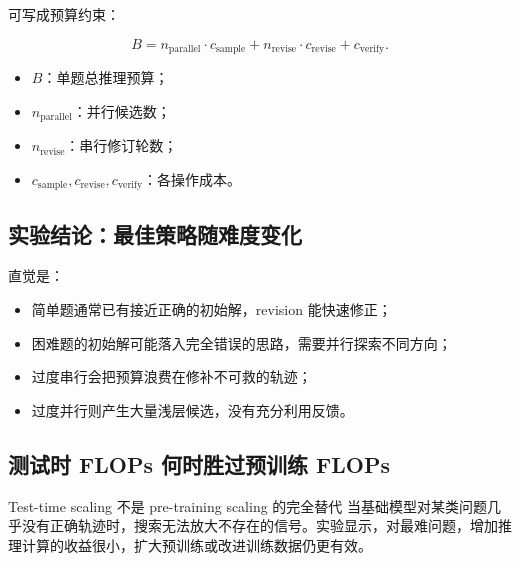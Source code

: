 \documentclass[a4paper]{article}
\begin{document}

可写成预算约束：

$$
B=n_{\mathrm{parallel}}\cdot c_{\mathrm{sample}}
+n_{\mathrm{revise}}\cdot c_{\mathrm{revise}}
+c_{\mathrm{verify}}.
$$

\begin{itemize}
    \item $B$：单题总推理预算；
    \item $n_{\mathrm{parallel}}$：并行候选数；
    \item $n_{\mathrm{revise}}$：串行修订轮数；
    \item $c_{\mathrm{sample}},c_{\mathrm{revise}},c_{\mathrm{verify}}$：各操作成本。
\end{itemize}

\subsection{实验结论：最佳策略随难度变化}



直觉是：

\begin{itemize}
    \item 简单题通常已有接近正确的初始解，revision 能快速修正；
    \item 困难题的初始解可能落入完全错误的思路，需要并行探索不同方向；
    \item 过度串行会把预算浪费在修补不可救的轨迹；
    \item 过度并行则产生大量浅层候选，没有充分利用反馈。
\end{itemize}

\subsection{测试时 FLOPs 何时胜过预训练 FLOPs}


\begin{importantbox}{Test-time scaling 不是 pre-training scaling 的完全替代}
当基础模型对某类问题几乎没有正确轨迹时，搜索无法放大不存在的信号。实验显示，对最难问题，增加推理计算的收益很小，扩大预训练或改进训练数据仍更有效。
\end{importantbox}
\end{document}
